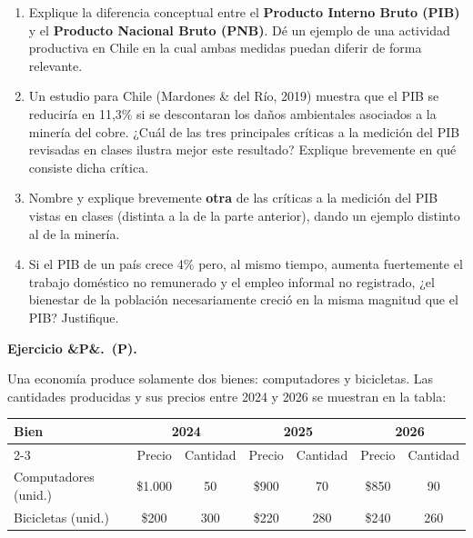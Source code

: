 \documentclass[11pt]{article}
\newcounter{ejercicio}
\newcommand{\ejercicio}[1][]{%
  \stepcounter{ejercicio}%
  \bigskip\noindent\textbf{Ejercicio \arabic{ejercicio}\ifx&#1&\relax.\else\ (#1).\fi}\ %
}
\newenvironment{partes}
  {\begin{enumerate}[label=(\alph*), leftmargin=1.5cm]}
  {\end{enumerate}}
\newenvironment{tabladatos}
  {\begin{center}}
  {\end{center}}
\begin{document}
\begin{partes}
  \item Explique la diferencia conceptual entre el \textbf{Producto Interno Bruto (PIB)} y el \textbf{Producto Nacional Bruto (PNB)}. Dé un ejemplo de una actividad productiva en Chile en la cual ambas medidas puedan diferir de forma relevante.
  \item Un estudio para Chile (Mardones \& del Río, 2019) muestra que el PIB se reduciría en 11,3\% si se descontaran los daños ambientales asociados a la minería del cobre. ¿Cuál de las tres principales críticas a la medición del PIB revisadas en clases ilustra mejor este resultado? Explique brevemente en qué consiste dicha crítica.
  \item Nombre y explique brevemente \textbf{otra} de las críticas a la medición del PIB vistas en clases (distinta a la de la parte anterior), dando un ejemplo distinto al de la minería.
  \item Si el PIB de un país crece 4\% pero, al mismo tiempo, aumenta fuertemente el trabajo doméstico no remunerado y el empleo informal no registrado, ¿el bienestar de la población necesariamente creció en la misma magnitud que el PIB? Justifique.
\end{partes}



\ejercicio[P]
Una economía produce solamente dos bienes: computadores y bicicletas. Las cantidades producidas y sus precios entre 2024 y 2026 se muestran en la tabla:

\begin{tabladatos}
\begin{tabular}{lcccccc}
\hline\hline
\multirow{2}{*}{\textbf{Bien}} & \multicolumn{2}{c}{\textbf{2024}} & \multicolumn{2}{c}{\textbf{2025}} & \multicolumn{2}{c}{\textbf{2026}} \\
\cline{2-3} \cline{4-5} \cline{6-7}
 & Precio & Cantidad & Precio & Cantidad & Precio & Cantidad \\
\hline
Computadores (unid.) & \$1.000 & 50 & \$900 & 70 & \$850 & 90 \\
Bicicletas (unid.) & \$200 & 300 & \$220 & 280 & \$240 & 260 \\
\hline\hline
\end{tabular}
\end{tabladatos}
\end{document}

